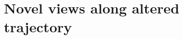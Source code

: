 

\begin{comment}
- As expected, the camera optimizer provides better results than the contrary on real data with imperfect camera poses. Atleast it ha a significantly higher PSNR, how do they compare qualitatively?
- As with the synthetic data, the optimized runs appear more blurry, but still achieves better scores on the metrics.


In the set of experiments that did not implement the naive Block NeRF approach, the results display noteworthy distinctions between different methodologies. The experiment wherein camera poses were approximated using COLMAP and subsequently optimized rendered the highest Peak Signal-to-Noise Ratio (PSNR). This particular experiment demonstrates superior performance in preserving original image detail and quality.

However, interestingly, the experiment utilizing COLMAP without any subsequent optimization yielded the best results in terms of the Structural Similarity Index Measure (SSIM) and the Learned Perceptual Image Patch Similarity (LPIPS). Despite these metrics being extremely close to the COLMAP run with optimization, their distinction in results is worth noting.

Delving deeper into qualitative outcomes, a stark contrast is observed between the two COLMAP runs. The experiment leveraging optimized camera poses generated results with a distinctly higher degree of blurriness compared to its counterpart that did not utilize optimized poses.

This observation highlights the intriguing impact of pose optimization on image clarity and indicates that while certain metrics might be optimized, subjective visual quality and the overall objective might vary significantly. These results collectively underline the complex interplay between technical metrics and perceptual outcomes in the realm of NeRF generation.
\end{comment}


\section{Novel views along altered trajectory}

